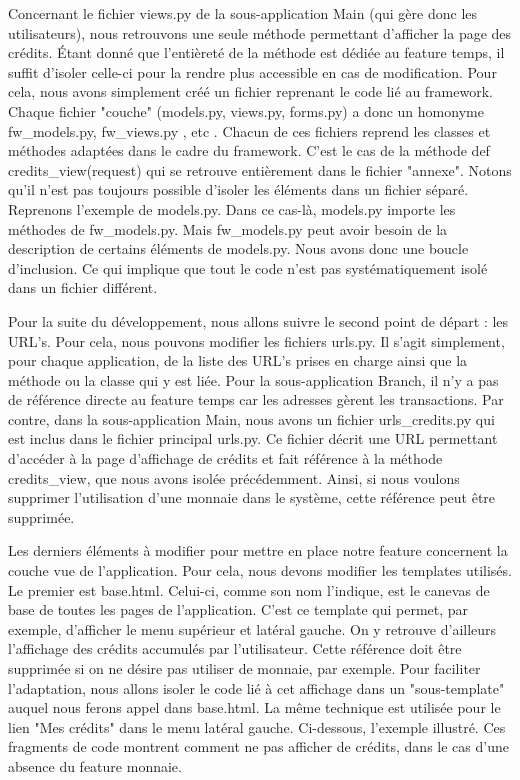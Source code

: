 Concernant le fichier views.py de la sous-application Main (qui gère donc les utilisateurs),  nous retrouvons une seule méthode permettant d'afficher la page des crédits.  Étant donné que l'entièreté de la méthode est dédiée au feature temps,  il suffit d'isoler celle-ci pour la rendre plus accessible en cas de modification.  Pour cela,  nous avons simplement créé un fichier reprenant le code lié au framework.  Chaque fichier "couche" (models.py,  views.py,  forms.py) a donc un homonyme fw\_models.py,  fw\_views.py ,  etc .  Chacun de ces fichiers reprend les classes et méthodes adaptées dans le cadre du framework.  C'est le cas de la méthode def credits\_view(request) qui se retrouve entièrement dans le fichier "annexe".  Notons qu'il n'est pas toujours possible d'isoler les éléments dans un fichier séparé.  Reprenons l'exemple de models.py.  Dans ce cas-là,  models.py importe les méthodes de fw\_models.py.  Mais fw\_models.py peut avoir besoin de la description de certains éléments de models.py.  Nous avons donc une boucle d'inclusion.  Ce qui implique que tout le code n'est pas systématiquement isolé dans un fichier différent.  

Pour la suite du développement,  nous allons suivre le second point de départ : les URL's.  Pour cela,  nous pouvons modifier les fichiers urls.py.  Il s'agit simplement,  pour chaque application,  de la liste des URL's prises en charge ainsi que la méthode ou la classe qui y est liée.  Pour la sous-application Branch,  il n'y a pas de référence directe au feature temps car les adresses gèrent les transactions.  Par contre,  dans la sous-application Main,  nous avons un fichier urls\_credits.py qui est inclus dans le fichier principal urls.py.  Ce fichier décrit une URL permettant d'accéder à la page d'affichage de crédits et fait référence à la méthode credits\_view,  que nous avons isolée précédemment.  Ainsi,  si nous voulons supprimer l'utilisation d'une monnaie dans le système,  cette référence peut être supprimée.  

Les derniers éléments à modifier pour mettre en place notre feature concernent la couche vue de l'application.  Pour cela,  nous devons modifier les templates utilisés. Le premier est base.html.  Celui-ci,  comme son nom l'indique,  est le canevas de base de toutes les pages de l'application.  C'est ce template qui permet,  par exemple,  d'afficher le menu supérieur et latéral gauche.  On y retrouve d'ailleurs l'affichage des crédits accumulés par l'utilisateur.  Cette référence doit être supprimée si on ne désire pas utiliser de monnaie,  par exemple.  Pour faciliter l'adaptation,  nous allons isoler le code lié à cet affichage dans un "sous-template" auquel nous ferons appel dans base.html.  La même technique est utilisée pour le lien "Mes crédits" dans le menu latéral gauche.  Ci-dessous,  l'exemple illustré.  Ces fragments de code montrent comment ne pas afficher de crédits,  dans le cas d'une absence du feature monnaie.  

